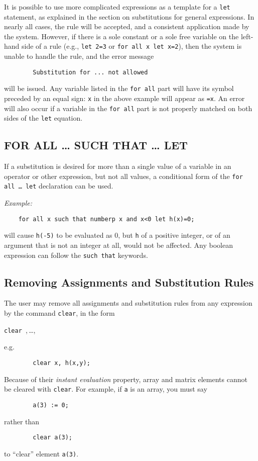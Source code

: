 It is possible to use more complicated expressions as a template for a
\texttt{let} statement, as explained in the section on substitutions for
general expressions.  In nearly all cases, the rule will be accepted, and
a consistent application made by the system.  However, if there is a sole
constant or a sole free variable on the left-hand side of a rule (e.g.,
\texttt{let 2=3} or \texttt{for all x let x=2}), then the system is unable to
handle the rule, and the error message
\begin{verbatim}
        Substitution for ... not allowed
\end{verbatim}
will be issued.  Any variable listed in the \texttt{for all} part will have
its symbol preceded by an equal sign: \texttt{x} in the above example will
appear as \texttt{=x}.  An error will also occur if a variable in the
\texttt{for all} part is not properly matched on both sides of the \texttt{let}
equation.

\subsection{FOR ALL \ldots{} SUCH THAT \ldots{} LET}
\hypertarget{command:SUCHTHAT}{}

If a substitution is desired for more than a single value of a variable in
an operator or other expression, but not all values, a conditional form of
the \texttt{for all \ldots{} let} declaration can be used.

\textit{Example:}
\begin{verbatim}
    for all x such that numberp x and x<0 let h(x)=0;
\end{verbatim}
will cause \texttt{h(-5)} to be evaluated as 0, but \texttt{h} of a positive
integer, or of an argument that is not an integer at all, would not be
affected.  Any boolean expression can follow the \texttt{such that} keywords.

\hypertarget{reserved:CLEAR}{\subsection{Removing Assignments and Substitution Rules}}

The user may remove all assignments and substitution rules from any
expression by the command \texttt{clear}, in the form
\begin{syntax}
  \texttt{clear },\,\dots,\,
\end{syntax}
e.g.
\begin{verbatim}
        clear x, h(x,y);
\end{verbatim}
Because of their \emph{instant evaluation} property, array and matrix elements
cannot be cleared with \texttt{clear}.  For example, if \texttt{a} is an array,
you must say
\begin{verbatim}
        a(3) := 0;
\end{verbatim}
rather than
\begin{verbatim}
        clear a(3);
\end{verbatim}
to ``clear'' element \texttt{a(3)}.


